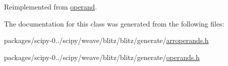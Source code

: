 Reimplemented from \hyperlink{classoperand_a1d3316b8c2df5057b027c4b37923ccad}{operand}.



The documentation for this class was generated from the following files\+:\begin{DoxyCompactItemize}
\item 
packages/scipy-\/0../scipy/weave/blitz/blitz/generate/\hyperlink{arroperands_8h}{arroperands.\+h}\item 
packages/scipy-\/0../scipy/weave/blitz/blitz/generate/\hyperlink{operands_8h}{operands.\+h}\end{DoxyCompactItemize}
